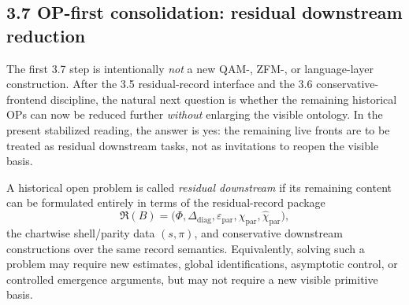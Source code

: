 \subsection*{3.7 OP-first consolidation: residual downstream reduction}
The first 3.7 step is intentionally \emph{not} a new QAM-, ZFM-, or language-layer construction. After the 3.5 residual-record interface and the 3.6 conservative-frontend discipline, the natural next question is whether the remaining historical OPs can now be reduced further \emph{without} enlarging the visible ontology. In the present stabilized reading, the answer is yes: the remaining live fronts are to be treated as residual downstream tasks, not as invitations to reopen the visible basis.

\begin{definition}
\label{def:mainline-3700}
A historical open problem is called \emph{residual downstream} if its remaining content can be formulated entirely in terms of the residual-record package
\[
  \mathfrak R(B)=\bigl(\Phi,\Delta_{\mathrm{diag}},\varepsilon_{\mathrm{par}},\chi_{\mathrm{par}},\widehat\chi_{\mathrm{par}}\bigr),
\]
the chartwise shell/parity data \((s,\pi)\), and conservative downstream constructions over the same record semantics. Equivalently, solving such a problem may require new estimates, global identifications, asymptotic control, or controlled emergence arguments, but may not require a new visible primitive basis.
\end{definition}

